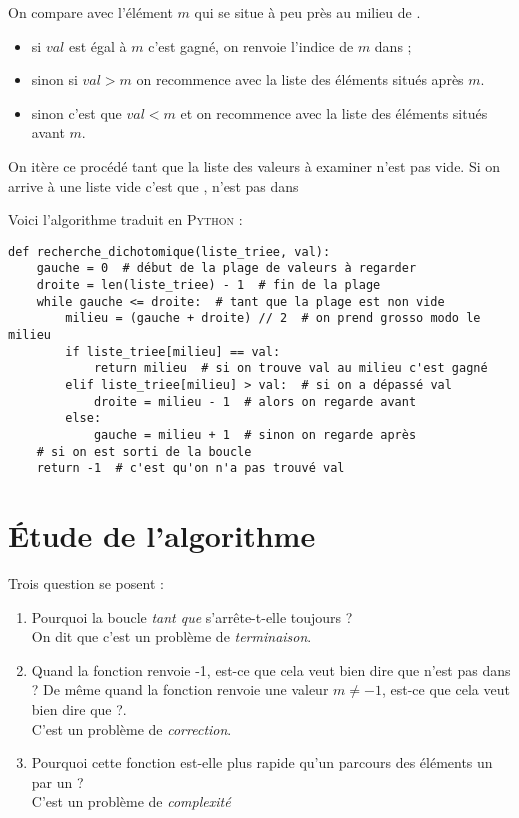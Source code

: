 \begin{methode}[]
On compare  avec l'élément $m$ qui se situe \og à peu près au milieu de \fg{}.
\begin{itemize}
    \item   si $val$ est égal à $m$ c'est gagné, on renvoie l'indice de $m$ dans  ;
    \item   sinon si $val>m$ on recommence avec la liste des éléments situés après $m$.
    \item   sinon c'est que $val<m$ et on recommence avec la liste des éléments situés avant $m$.
\end{itemize}
On itère ce procédé tant que la liste des valeurs à examiner n'est pas vide. Si on arrive à une liste vide c'est que  , n'est pas dans 
\end{methode}
Voici l'algorithme traduit en \textsc{Python} :
\begin{pys}
\begin{verbatim}
def recherche_dichotomique(liste_triee, val):
    gauche = 0  # début de la plage de valeurs à regarder
    droite = len(liste_triee) - 1  # fin de la plage
    while gauche <= droite:  # tant que la plage est non vide
        milieu = (gauche + droite) // 2  # on prend grosso modo le milieu
        if liste_triee[milieu] == val:
            return milieu  # si on trouve val au milieu c'est gagné
        elif liste_triee[milieu] > val:  # si on a dépassé val
            droite = milieu - 1  # alors on regarde avant
        else:
            gauche = milieu + 1  # sinon on regarde après
    # si on est sorti de la boucle
    return -1  # c'est qu'on n'a pas trouvé val
\end{verbatim}
\end{pys}

\section{\'Etude de l'algorithme}

Trois question se posent :

\begin{enumerate}
    \item   Pourquoi la boucle \textit{tant que} s'arrête-t-elle toujours ?\\ On dit que c'est un problème de \textit{terminaison}.
    \item   Quand la fonction renvoie -1, est-ce que cela veut bien dire que  n'est pas dans  ? De même quand la fonction renvoie une valeur $m\neq -1$, est-ce que cela veut bien dire que  ?.\\
    C'est un problème de \textit{correction}.
    \item   Pourquoi cette fonction est-elle plus rapide qu'un parcours des éléments un par un ?\\ C'est un problème de \textit{complexité}
\end{enumerate}

